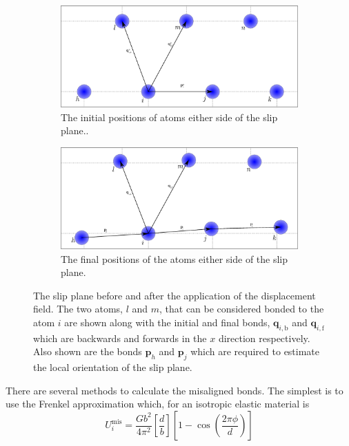\begin{figure}
\centering
\begin{subfigure}{\textwidth}
\centering
\includegraphics[width=\textwidth]{initial_slip_plane_bonds}
\caption{The initial positions of atoms either side of the slip plane.\label{fig:slip_plane_initial_positions}.}
\end{subfigure}
\par\medskip
\begin{subfigure}{\textwidth}
\includegraphics[width=\textwidth]{slip_plane_bonds}
\caption{The final positions of the atoms either side of the slip plane.\label{fig:slip_plane_final_positions}}
\end{subfigure}
\caption{The slip plane before and after the application of the displacement field. The two atoms, $l$ and $m$, that can be considered bonded to the atom $i$ are shown along with the initial and final bonds, $\mathbf{q}_{i,\text{b}}$ and $\mathbf{q}_{i,\text{f}}$ which are backwards and forwards in the $x$ direction respectively. Also shown are the bonds $\mathbf{p}_h$ and $\mathbf{p}_j$ which are required to estimate the local orientation of the slip plane. \label{fig:slip_plane}}
\end{figure}


There are several methods to calculate the misaligned bonds. The simplest is to use the Frenkel approximation which, for an isotropic elastic material is 
\begin{equation}
U_i^\text{mis} = \frac{Gb^2}{4\pi^2} \left[\frac{d}{b}\right] \left[ 1 - \cos \left( \frac{2 \pi \phi}{d} \right) \right]
\end{equation}

